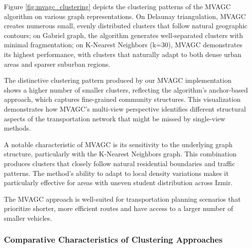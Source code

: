 Figure \ref{fig:mvagc_clustering} depicts the clustering patterns of the MVAGC algorithm on various graph representations. On Delaunay triangulation, MVAGC creates numerous small, evenly distributed clusters that follow natural geographic contours; on Gabriel graph, the algorithm generates well-separated clusters with minimal fragmentation; on K-Nearest Neighbors (k=30), MVAGC demonstrates its highest performance, with clusters that naturally adapt to both dense urban areas and sparser suburban regions.

The distinctive clustering pattern produced by our MVAGC implementation shows a higher number of smaller clusters, reflecting the algorithm's anchor-based approach, which captures fine-grained community structures. This visualization demonstrates how MVAGC's multi-view perspective identifies different structural aspects of the transportation network that might be missed by single-view methods.

A notable characteristic of MVAGC is its sensitivity to the underlying graph structure, particularly with the K-Nearest Neighbors graph. This combination produces clusters that closely follow natural residential boundaries and traffic patterns. The method's ability to adapt to local density variations makes it particularly effective for areas with uneven student distribution across Izmir.

The MVAGC approach is well-suited for transportation planning scenarios that prioritize shorter, more efficient routes and have access to a larger number of smaller vehicles.

\subsubsection{Comparative Characteristics of Clustering Approaches}
\label{subsubsec:clustering_comparison}

